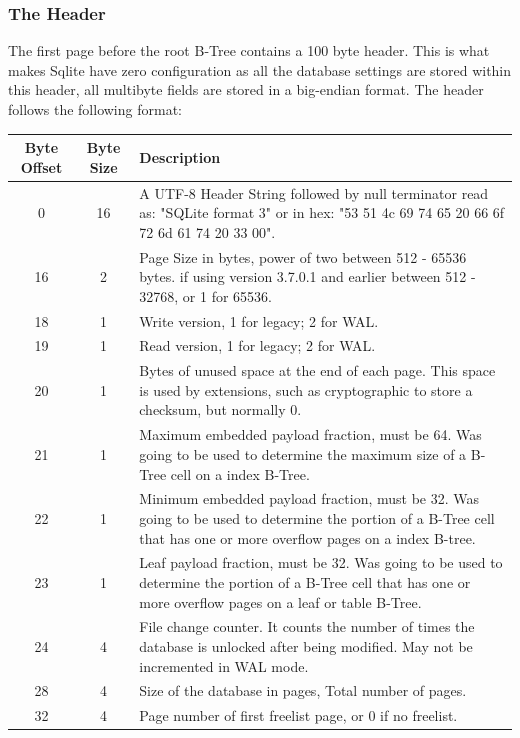 \subsubsection{The Header}
\label{subsubsec:sqlite_page_hader}

The first page before the root B-Tree contains a 100 byte header. This is what makes Sqlite have zero configuration as all the database settings are stored within this header, all multibyte fields are stored in a big-endian format. The header follows the following format: 

\begin{longtable}[h]{| c | c | p{10cm} |}
		\hline
			\textbf{Byte Offset} & \textbf{Byte Size} & \textbf{Description} \\ 
		\hline
		\endhead
			0 & 16 & A UTF-8 Header String followed by null terminator read as: "SQLite format 3" or in hex: "53 51 4c 69 74 65 20 66 6f 72 6d 61 74 20 33 00". \\
		\hline
			16 & 2 & Page Size 	in bytes, power of two between 512 - 65536 bytes. if using version 3.7.0.1 and earlier between 512 - 32768, or 1 for 65536. \\
		\hline
			18 & 1 & Write version, 1 for legacy; 2 for WAL. \\
		\hline
			19 & 1 & Read version, 1 for legacy; 2 for WAL. \\
		\hline
			20 & 1 & Bytes of unused space at the end of each page. This space is used by extensions, such as cryptographic to store a checksum, but normally 0. \\
		\hline
			21 & 1 & Maximum embedded payload fraction, must be 64. Was going to be used to determine the maximum size of a B-Tree cell on a index B-Tree. \\
		\hline
			22 & 1 & Minimum embedded payload fraction, must be 32. Was going to be used to determine the portion of a B-Tree cell that has one or more overflow pages on a index B-tree. \\
		\hline
			23 & 1 & Leaf payload fraction, must be 32. Was going to be used to determine the portion of a B-Tree cell that has one or more overflow pages on a leaf or table B-Tree. \\
		\hline
			24 & 4 & File change counter. It counts the number of times the database is unlocked after being modified. May not be incremented in WAL mode. \\
		\hline
			28 & 4 & Size of the database in pages, Total number of pages. \\
		\hline
			32 & 4 & Page number of first freelist page, or 0 if no freelist. \\

\end{longtable}
